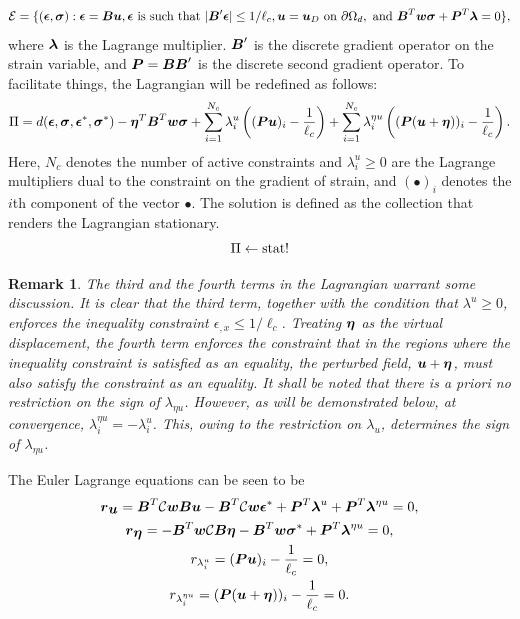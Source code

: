 \documentclass[12pt]{elsarticle}
\newtheorem*{remark}{Remark}
\begin{document}
\begin{equation}
	\mathcal{E} = \{(\mbox{\boldmath $\epsilon$},\mbox{\boldmath $\sigma$}) : \mbox{\boldmath $\epsilon$} = \mbox{\boldmath $B$} \mbox{\boldmath $u$}, \mbox{\boldmath $\epsilon$} \text{ is such that } |\mbox{\boldmath $B$}' \mbox{\boldmath $\epsilon$}|  \leq 1/{\ell_c} ,\mbox{\boldmath $u$} = \mbox{\boldmath $u$}_D \text{ on } \partial \Omega_d,
	\text{ and } \mbox{\boldmath $B$} ^T\mbox{\boldmath $w$} \mbox{\boldmath $\sigma$} + \mbox{\boldmath $P$}^T \mbox{\boldmath $\lambda$} = 0     \},
\end{equation}
where $\mbox{\boldmath $\lambda$}$ is the Lagrange multiplier. $\mbox{\boldmath $B$}'$ is the discrete gradient operator on the strain variable, and $\mbox{\boldmath $P$} = \mbox{\boldmath $B$} \mbox{\boldmath $B$}'$ is the discrete second gradient operator. To facilitate things, the Lagrangian will be redefined as follows:
\begin{equation}
	\Pi = d(\mbox{\boldmath $\epsilon$},\mbox{\boldmath $\sigma$},\mbox{\boldmath $\epsilon$}^*,\mbox{\boldmath $\sigma$}^*) - \mbox{\boldmath $\eta$}^T \mbox{\boldmath $B$} ^T \mbox{\boldmath $w$}\mbox{\boldmath $\sigma$} + \sum_{i=1}^{N_c} \lambda^u_i \left( (\mbox{\boldmath $P$} \mbox{\boldmath $u$})_i - \frac{1}{\ell_c}   \right) + \sum_{i=1}^{N_c} \lambda^{\eta u}_i \left( (\mbox{\boldmath $P$} (\mbox{\boldmath $u$} + \mbox{\boldmath $\eta$}))_i - \frac{1}{\ell_c}   \right).
\end{equation}
Here, $N_c$ denotes the number of active constraints and $\lambda^u_i \geq 0$ are the Lagrange multipliers dual to the constraint on the gradient of strain, and $(\bullet)_i$ denotes the $i$th component of the vector $\bullet$. The solution is defined as the collection that renders the Lagrangian stationary.
\begin{equation}
	\Pi  \leftarrow \operatorname{stat}!
\end{equation}

\begin{remark}
	The third and the fourth terms in the Lagrangian warrant some discussion. It is clear that the third term, together with the condition that $\lambda^u\geq0$, enforces the inequality constraint $\epsilon_{,x} \leq 1/\ell_c$. Treating $\mbox{\boldmath $\eta$}$ as the virtual displacement, the fourth term enforces the constraint that in the regions where the inequality constraint is satisfied as an equality, the perturbed field, $\mbox{\boldmath $u$}+\mbox{\boldmath $\eta$}$, must also satisfy the constraint as an equality. It shall be noted that there is a priori no restriction on the sign of $\lambda_{\eta u}$. However, as will be demonstrated below, at convergence, $\lambda^{\eta u}_i = -\lambda^{ u}_i$. This, owing to the restriction on $\lambda_u$, determines the sign of $\lambda_{\eta u}$.
\end{remark}

 


The Euler Lagrange equations can be seen to be
\begin{gather}
	\mbox{\boldmath $r$}_{\mbox{\boldmath $u$}} = \mbox{\boldmath $B$}^T \mathcal{C}\mbox{\boldmath $w$} \mbox{\boldmath $B$} \mbox{\boldmath $u$} - \mbox{\boldmath $B$}^T \mathcal{C}\mbox{\boldmath $w$} \mbox{\boldmath $\epsilon$} ^* + \mbox{\boldmath $P$}^T \mbox{\boldmath $\lambda$}^u +\mbox{\boldmath $P$}^T \mbox{\boldmath $\lambda$}^{\eta u}  =0, \label{residual_u_1D_DD} \\
	\mbox{\boldmath $r$}_{\mbox{\boldmath $\eta$}} = -\mbox{\boldmath $B$}^T\mbox{\boldmath $w$} \mathcal{C} \mbox{\boldmath $B$} \mbox{\boldmath $\eta$} - \mbox{\boldmath $B$}^T\mbox{\boldmath $w$} \mbox{\boldmath $\sigma$} ^* +\mbox{\boldmath $P$}^T \mbox{\boldmath $\lambda$}^{\eta u} =0, \\
	r_{\lambda^u_i} =  (\mbox{\boldmath $P$} \mbox{\boldmath $u$})_i - \frac{1}{\ell_c}  =0, \\
	r_{\lambda^{\eta u}_i} =  (\mbox{\boldmath $P$} (\mbox{\boldmath $u$} + \mbox{\boldmath $\eta$}))_i - \frac{1}{\ell_c}  =0. 
\end{gather}
\end{document}
